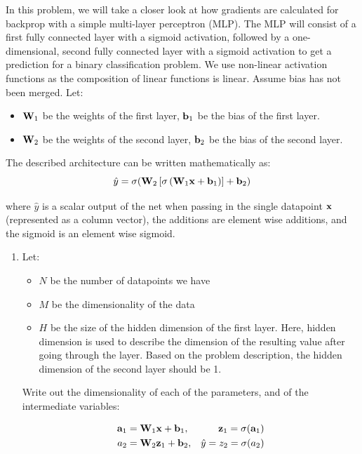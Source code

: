 \documentclass[submit]{harvardml}
\begin{document}
\begin{problem}

    In this problem, we will take a closer look at how gradients are calculated for backprop with a simple multi-layer perceptron (MLP). The MLP will consist of a first fully connected layer with a sigmoid activation, followed by a one-dimensional, second fully connected layer with a sigmoid activation to get a prediction for a binary classification problem. We use non-linear activation functions as the composition of linear functions is linear. Assume bias has not been merged. Let:
    \begin{itemize}
        \item $\bold{W}_1$ be the weights of the first layer, $\bold{b}_1$ be the bias of the first layer.
        \item $\bold{W}_2$ be the weights of the second layer, $\bold{b}_2$ be the bias of the second layer.
    \end{itemize}
    
    The described architecture can be written mathematically as: $$\hat{y} = \sigma(\bold{W}_2 \left[\sigma \left(\bold{W}_1 \bold{x} + \bold{b}_1\right)\right] + \bold{b}_2)$$
    
    where $\hat{y}$ is a scalar output of the net when passing in the single datapoint $\bold{x}$ (represented as a column vector), the additions are element wise additions, and the sigmoid is an element wise sigmoid.
    
    \begin{enumerate}
        \item Let:
        \begin{itemize}
            \item $N$ be the number of datapoints we have
            \item $M$ be the dimensionality of the data
            \item $H$ be the size of the hidden dimension of the first layer. Here, hidden dimension is used to describe the dimension of the resulting value after going through the layer. Based on the problem description, the hidden dimension of the second layer should be 1.
        \end{itemize}
        
        Write out the dimensionality of each of the parameters, and of the intermediate variables:
  
            \begin{align*}
            \bold{a}_1 &= \bold{W}_1 \bold{x} + \bold{b}_1, 
            &\bold{z}_1 = \sigma(\bold{a}_1) \\
            a_2 &= \bold{W}_2 \bold{z}_1 + \bold{b}_2, 
            &\hat{y} = z_2 = \sigma(a_2)
            \end{align*}
            

\end{enumerate}
\end{problem}
\end{document}
